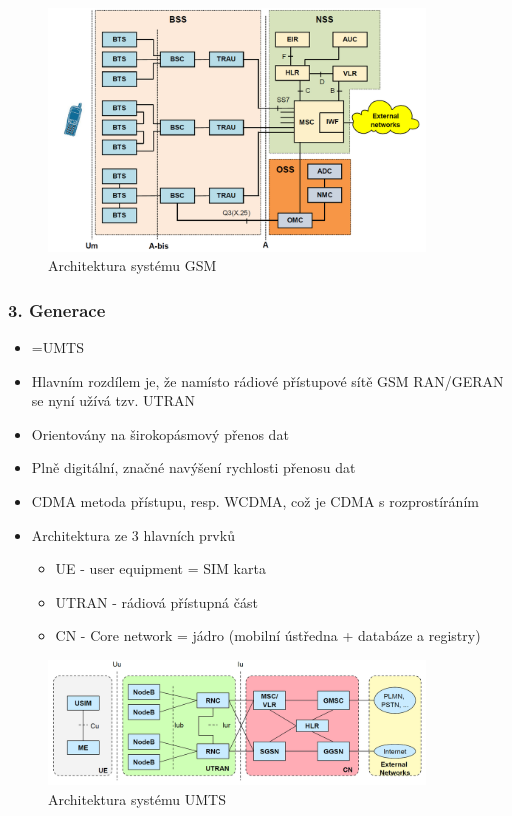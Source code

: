\documentclass[10pt,a4paper]{article}
\begin{document}
\begin{figure}[ht]
    \centering
    \includegraphics[width=10cm]{gsmArchitektura.png}
    \caption{Architektura systému GSM}
    \label{fig:gsmArchitektura}
\end{figure}

\subsubsection{3. Generace}

\begin{itemize}
\item =UMTS
\item Hlavním rozdílem je, že namísto rádiové přístupové sítě GSM RAN/GERAN se nyní užívá tzv. UTRAN
\item Orientovány na širokopásmový přenos dat
\item Plně digitální, značné navýšení rychlosti přenosu dat
\item CDMA metoda přístupu, resp. WCDMA, což je CDMA s rozprostíráním
\item Architektura ze 3 hlavních prvků
\begin{itemize}
\item UE - user equipment = SIM karta
\item UTRAN - rádiová přístupná část
\item CN - Core network = jádro (mobilní ústředna + databáze a registry)
\end{itemize}
\end{itemize}
\begin{figure}[ht]
    \centering
    \includegraphics[width=10cm]{umtsArchitektura.png}
    \caption{Architektura systému UMTS}
    \label{fig:umtsArchitektura}
\end{figure}
\end{document}
